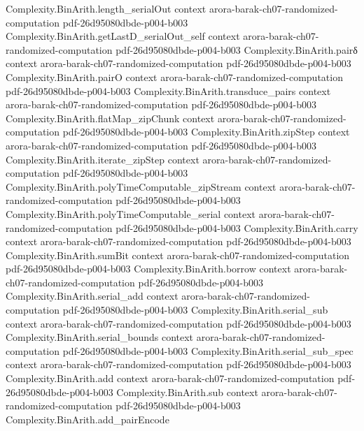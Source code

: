 \begin{theorem}
\proofstep
  {Complexity.BinArith.length_serialOut}
  {context}
  {arora-barak-ch07-randomized-computation}
  {pdf-26d95080dbde-p004-b003}
\proofstep
  {Complexity.BinArith.getLastD_serialOut_self}
  {context}
  {arora-barak-ch07-randomized-computation}
  {pdf-26d95080dbde-p004-b003}
\proofstep
  {Complexity.BinArith.pairδ}
  {context}
  {arora-barak-ch07-randomized-computation}
  {pdf-26d95080dbde-p004-b003}
\proofstep
  {Complexity.BinArith.pairO}
  {context}
  {arora-barak-ch07-randomized-computation}
  {pdf-26d95080dbde-p004-b003}
\proofstep
  {Complexity.BinArith.transduce_pairs}
  {context}
  {arora-barak-ch07-randomized-computation}
  {pdf-26d95080dbde-p004-b003}
\proofstep
  {Complexity.BinArith.flatMap_zipChunk}
  {context}
  {arora-barak-ch07-randomized-computation}
  {pdf-26d95080dbde-p004-b003}
\proofstep
  {Complexity.BinArith.zipStep}
  {context}
  {arora-barak-ch07-randomized-computation}
  {pdf-26d95080dbde-p004-b003}
\proofstep
  {Complexity.BinArith.iterate_zipStep}
  {context}
  {arora-barak-ch07-randomized-computation}
  {pdf-26d95080dbde-p004-b003}
\proofstep
  {Complexity.BinArith.polyTimeComputable_zipStream}
  {context}
  {arora-barak-ch07-randomized-computation}
  {pdf-26d95080dbde-p004-b003}
\proofstep
  {Complexity.BinArith.polyTimeComputable_serial}
  {context}
  {arora-barak-ch07-randomized-computation}
  {pdf-26d95080dbde-p004-b003}
\proofstep
  {Complexity.BinArith.carry}
  {context}
  {arora-barak-ch07-randomized-computation}
  {pdf-26d95080dbde-p004-b003}
\proofstep
  {Complexity.BinArith.sumBit}
  {context}
  {arora-barak-ch07-randomized-computation}
  {pdf-26d95080dbde-p004-b003}
\proofstep
  {Complexity.BinArith.borrow}
  {context}
  {arora-barak-ch07-randomized-computation}
  {pdf-26d95080dbde-p004-b003}
\proofstep
  {Complexity.BinArith.serial_add}
  {context}
  {arora-barak-ch07-randomized-computation}
  {pdf-26d95080dbde-p004-b003}
\proofstep
  {Complexity.BinArith.serial_sub}
  {context}
  {arora-barak-ch07-randomized-computation}
  {pdf-26d95080dbde-p004-b003}
\proofstep
  {Complexity.BinArith.serial_bounds}
  {context}
  {arora-barak-ch07-randomized-computation}
  {pdf-26d95080dbde-p004-b003}
\proofstep
  {Complexity.BinArith.serial_sub_spec}
  {context}
  {arora-barak-ch07-randomized-computation}
  {pdf-26d95080dbde-p004-b003}
\proofstep
  {Complexity.BinArith.add}
  {context}
  {arora-barak-ch07-randomized-computation}
  {pdf-26d95080dbde-p004-b003}
\proofstep
  {Complexity.BinArith.sub}
  {context}
  {arora-barak-ch07-randomized-computation}
  {pdf-26d95080dbde-p004-b003}
\proofstep
  {Complexity.BinArith.add_pairEncode}

\end{theorem}
